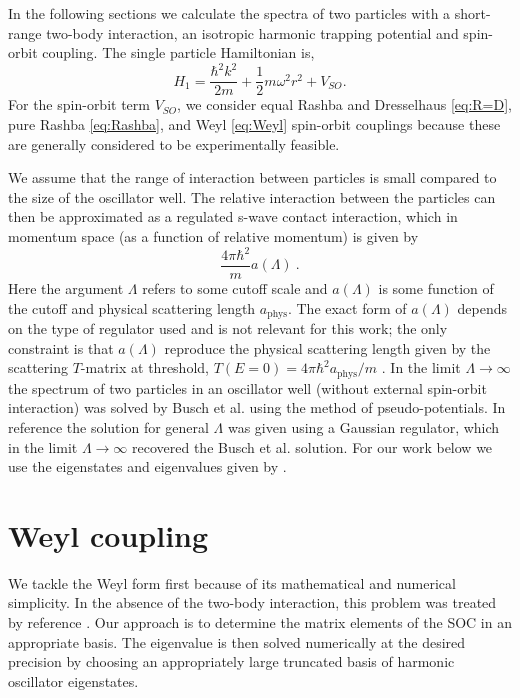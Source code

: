 \documentclass[%
 preprint,
 amsmath,amssymb,
 aps,
]{revtex4-1}
\begin{document}
In the following sections we calculate the spectra of two particles with a short-range two-body interaction, an isotropic harmonic trapping potential and spin-orbit coupling. The single particle Hamiltonian is,
\begin{equation}\label{eq:shortRangeInteraction}
H_1=\frac{\hbar^2 k^2}{2m}+\frac{1}{2}m\omega^2 r^2 + V_{SO}.
\end{equation}
For the spin-orbit term $V_{SO}$, we consider equal Rashba and Dresselhaus \eqref{eq:R=D}, pure Rashba \eqref{eq:Rashba}, and Weyl \eqref{eq:Weyl} spin-orbit couplings  because these are generally considered to be experimentally feasible.

We assume that the range of interaction between particles is small compared to the size of the oscillator well.  The relative interaction between the particles can then be approximated as a regulated s-wave contact interaction, which in momentum space (as a function of relative momentum) is given by
\begin{equation}
\frac{4\pi \hbar^2}{m}a(\Lambda)\ .
\end{equation}
Here the argument $\Lambda$ refers to some cutoff scale and $a(\Lambda)$ is some function of the cutoff and physical scattering length $a_{\text{phys}}$.  The exact form of $a(\Lambda)$ depends on the type of regulator used and is not relevant for this work; the only constraint is that $a(\Lambda)$ reproduce the physical scattering length given by the scattering $T$-matrix at threshold, $T(E=0)=4\pi\hbar^2 a_{\text{phys}}/m$ \cite{taylor2000}. In the limit $\Lambda\rightarrow \infty$ the spectrum of two particles in an oscillator well (without external spin-orbit interaction) was solved by Busch et al. \cite{Busch} using the method of pseudo-potentials.  In reference  \cite{Luu:2006xv} the solution for general $\Lambda$ was given using a Gaussian regulator, which in the limit $\Lambda\rightarrow\infty$ recovered the Busch et al. solution.  For our work below we use the eigenstates and eigenvalues given by  \cite{Busch}.

\section{\label{sec:Weyl}Weyl coupling}
We tackle the Weyl form first because of its mathematical and numerical simplicity. In the absence of the two-body interaction, this problem was treated by reference \cite{0953-4075-46-13-134003}. Our approach is to determine the matrix elements of the SOC in an appropriate basis. The eigenvalue is then solved numerically at the desired precision by choosing an appropriately large truncated basis of harmonic oscillator eigenstates.
\end{document}
